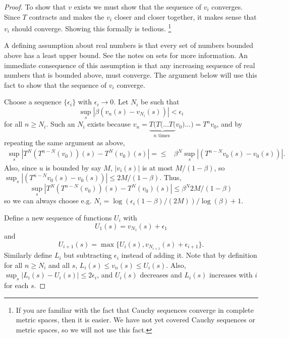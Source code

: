 \begin{proof}
  To show that $v$ exists we must show that the sequence of $v_i$
  converges.  Since $T$ contracts and makes the $v_i$ closer and
  closer together, it makes sense that $v_i$ should converge. Showing
  this formally is tedious.  \footnote{If you are familiar with the fact
    that Cauchy sequences converge in complete metric spaces, then it
    is easier. We have not yet covered Cauchy sequences or metric
    spaces, so we will not use this fact.}

  A defining assumption about real numbers is that every set of
  numbers bounded above has a least upper bound. See the notes on sets
  for more information. An immediate consequence of this assumption is
  that any increasing sequence of real numbers that is bounded above,
  must converge. The argument below will use this fact to show that
  the sequence of $v_i$ converge. 
  
  Choose a sequence $\{\epsilon_i\}$ with $\epsilon_i \to 0$. Let
  $N_i$ be such that 
  \[ \sup_s \left\vert \beta(v_{n}(s) -v_{N_i}(s))  \right \vert <
  \epsilon_i \]
  for all $n \geq N_i$. Such an $N_i$ exists because $v_n =
  \underbrace{T(T (
    ... T(}_{n \text{ times }} v_0) ... ) = T^n v_0$, and by repeating
  the same argument as above,
  \begin{align*}
    \sup_{s} \left\vert T^N (T^{n-N}( v_0))(s)- T^N(v_0) (s) \right\vert = 
    \leq & \beta^N \sup_s \left\vert (T^{n-N}v_0(s) -v_0(s)) \right\vert.
  \end{align*}
  Also, since $u$ is bounded by say $M$, $|v_i(s)|$ is at most
  $M/(1-\beta)$, so $\sup_s \left\vert (T^{n-N}v_0(s) -v_0(s))
  \right\vert \leq 2 M /(1-\beta)$. Thus,
  \[ 
    \sup_{s} \left\vert T^N (T^{n-N}( v_0))(s)- T^N(v_0) (s) \right\vert
    \leq \beta^N 2M/(1-\beta)  
  \]
  so we can always choose e.g. $N_i = \log(\epsilon_i
  (1-\beta)/(2M))/\log(\beta) + 1$.
  
  Define a new sequence of functions $U_i$ with 
  \[ U_1(s) = v_{N_1}(s) + \epsilon_1 \] and 
  \[ U_{i+1}(s) = \max\{
  U_{i}(s), v_{N_{i+1}}(s) + \epsilon_{i+1} \}.\] Similarly define $L_i$
  but subtracting $\epsilon_i$ instead of adding it. 
  Note that by definition for all $n \geq N_i$ and all
  $s$, $L_i(s) \leq v_n(s) \leq U_i(s)$. Also, $\sup_{s} |L_i(s) -
  U_i(s) | \leq 2\epsilon_i$, and $U_i(s)$ decreases and $L_i(s)$
  increases with $i$ for each $s$. 


\end{proof}
